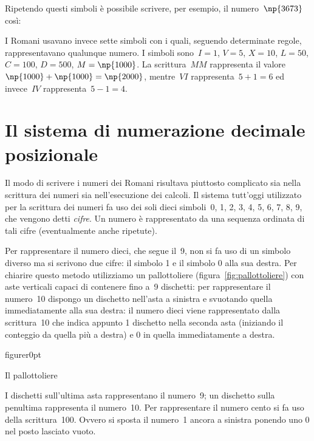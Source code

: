 
\vspace{-4ex}
Ripetendo questi simboli è possibile scrivere, per esempio, il numero~$\np{3673}$ così:

\vspace{-2ex}\vspace{-2ex}

I Romani usavano invece sette simboli con i quali, seguendo determinate regole,
rappresentavano qualunque numero. I simboli sono~$I=1$, $V=5$, $X=10$, $L=50$, $C=100$, $D=500$, $M=\np{1000}$.
La scrittura~$MM$ rappresenta il valore~$\np{1000}+\np{1000} = \np{2000}$, mentre~$VI$ rappresenta~$5+1=6$ ed invece~$IV$ rappresenta~$5-1=4$.

\section{Il sistema di numerazione decimale posizionale}
Il modo di scrivere i numeri dei Romani risultava piuttosto complicato sia nella scrittura
dei numeri sia nell'esecuzione dei calcoli. Il sistema tutt'oggi utilizzato per la scrittura dei numeri fa uso dei soli dieci simboli~0, 1, 2, 3, 4, 5, 6, 7, 8, 9, che vengono detti \emph{cifre}. Un numero è rappresentato da una sequenza ordinata di tali cifre (eventualmente anche ripetute).

Per rappresentare il numero dieci, che segue il~9, non si fa uso di un simbolo diverso ma si scrivono due cifre: il simbolo 1 e il simbolo 0 alla sua destra. Per chiarire questo metodo utilizziamo un pallottoliere (figura~\ref{fig:pallottoliere}) con aste verticali capaci di contenere fino a~9 dischetti: per rappresentare il numero~10 dispongo un dischetto nell'asta a sinistra e svuotando quella immediatamente alla sua destra: il numero dieci viene rappresentato dalla scrittura~10 che indica appunto 1 dischetto nella seconda asta (iniziando il conteggio da quella più a destra) e 0 in quella immediatamente a destra.

\begin{wrapfloat}{figure}{r}{0pt}

\caption{Il pallottoliere}
\label{fig:pallottoliere}
\end{wrapfloat}

I dischetti sull'ultima asta rappresentano il numero~9; un dischetto sulla penultima
rappresenta il numero~10. Per rappresentare il numero cento si fa uso della scrittura~100.
Ovvero si sposta il numero~1 ancora a sinistra ponendo uno 0 nel posto lasciato vuoto.

